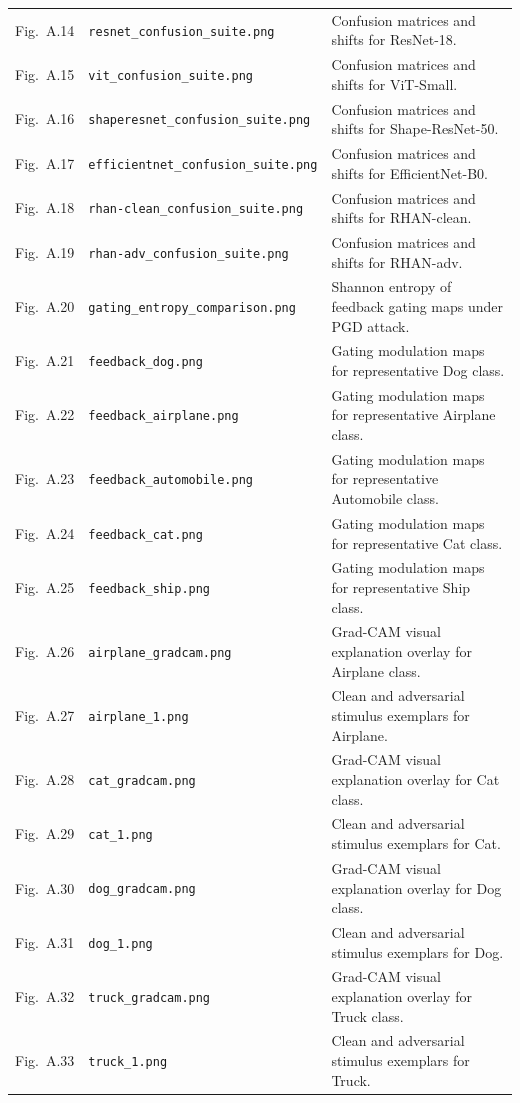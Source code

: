 \documentclass[12pt,a4paper]{article}
\begin{document}
\begin{longtable}{llp{9.5cm}}
\midrule
Fig.~A.14 & \texttt{resnet\_confusion\_suite.png} & Confusion matrices and shifts for ResNet-18. \\
Fig.~A.15 & \texttt{vit\_confusion\_suite.png} & Confusion matrices and shifts for ViT-Small. \\
Fig.~A.16 & \texttt{shaperesnet\_confusion\_suite.png} & Confusion matrices and shifts for Shape-ResNet-50. \\
Fig.~A.17 & \texttt{efficientnet\_confusion\_suite.png} & Confusion matrices and shifts for EfficientNet-B0. \\
Fig.~A.18 & \texttt{rhan-clean\_confusion\_suite.png} & Confusion matrices and shifts for RHAN-clean. \\
Fig.~A.19 & \texttt{rhan-adv\_confusion\_suite.png} & Confusion matrices and shifts for RHAN-adv. \\
\midrule
Fig.~A.20 & \texttt{gating\_entropy\_comparison.png} & Shannon entropy of feedback gating maps under PGD attack. \\
Fig.~A.21 & \texttt{feedback\_dog.png} & Gating modulation maps for representative Dog class. \\
Fig.~A.22 & \texttt{feedback\_airplane.png} & Gating modulation maps for representative Airplane class. \\
Fig.~A.23 & \texttt{feedback\_automobile.png} & Gating modulation maps for representative Automobile class. \\
Fig.~A.24 & \texttt{feedback\_cat.png} & Gating modulation maps for representative Cat class. \\
Fig.~A.25 & \texttt{feedback\_ship.png} & Gating modulation maps for representative Ship class. \\
\midrule
Fig.~A.26 & \texttt{airplane\_gradcam.png} & Grad-CAM visual explanation overlay for Airplane class. \\
Fig.~A.27 & \texttt{airplane\_1.png} & Clean and adversarial stimulus exemplars for Airplane. \\
Fig.~A.28 & \texttt{cat\_gradcam.png} & Grad-CAM visual explanation overlay for Cat class. \\
Fig.~A.29 & \texttt{cat\_1.png} & Clean and adversarial stimulus exemplars for Cat. \\
Fig.~A.30 & \texttt{dog\_gradcam.png} & Grad-CAM visual explanation overlay for Dog class. \\
Fig.~A.31 & \texttt{dog\_1.png} & Clean and adversarial stimulus exemplars for Dog. \\
Fig.~A.32 & \texttt{truck\_gradcam.png} & Grad-CAM visual explanation overlay for Truck class. \\
Fig.~A.33 & \texttt{truck\_1.png} & Clean and adversarial stimulus exemplars for Truck. \\
\end{longtable}
\end{document}
